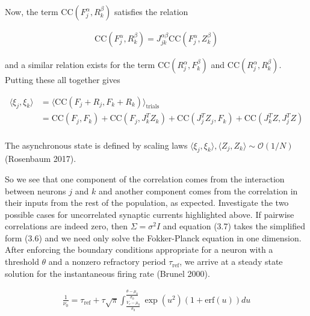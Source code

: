 \documentclass{ucetd}
\begin{document}
Now, the term $\mathrm{CC}(F_{j}^{\alpha},R_{k}^{\beta})$ satisfies the relation

\begin{align*}
\mathrm{CC}(F_{j}^{\alpha},R_{k}^{\beta}) = J^{\alpha\beta}_{jk}\mathrm{CC}(F_{j}^{\alpha},Z_{k}^{\beta})
\end{align*}

and a similar relation exists for the term $\mathrm{CC}(R_{j}^{\alpha},F_{k}^{\beta})$ and $\mathrm{CC}(R_{j}^{\alpha},R_{k}^{\beta})$. Putting these all together gives

\begin{align*}
\langle \xi_{j}, \xi_{k}\rangle &= \langle\mathrm{CC}(F_{j} + R_{j},F_{k} + R_{k})\rangle_{\mathrm{trials}}\\
&= \mathrm{CC}(F_{j},F_{k}) + \mathrm{CC}(F_{j},J_{k}^{T}Z_{k}) + \mathrm{CC}(J_{j}^{T} Z_{j}, F_{k}) + \mathrm{CC}(J_{k}^{T}Z, J_{j}^{T}Z) \\
\end{align*}

The asynchronous state is defined by scaling laws $\langle \xi_{j}, \xi_{k}\rangle, \langle Z_{j}, Z_{k}\rangle \sim \mathcal{O}(1/N)$ (Rosenbaum 2017).


So we see that one component of the correlation comes from the interaction between neurons $j$ and $k$ and another component comes from the correlation in their inputs from the rest of the population, as expected. Investigate the two possible cases for uncorrelated synaptic currents highlighted above. If pairwise correlations are indeed zero, then $\Sigma = \sigma^{2}I$ and equation (3.7) takes the simplified form (3.6) and we need only solve the Fokker-Planck equation in one dimension. After enforcing the boundary conditions appropriate for a neuron with a threshold $\theta$ and a nonzero refractory period $\tau_{\mathrm{ref}}$, we arrive at a steady state solution for the instantaneous firing rate (Brunel 2000). 

\begin{align}
\frac{1}{\nu_{0}} = \tau_{\mathrm{ref}} + \tau\sqrt{\pi}\int_{\frac{V_{r}-\mu_{0}}{\sigma_{0}}}^{\frac{\theta-\mu_{0}}{\sigma_{0}}} \exp(u^{2})(1+\mathrm{erf}(u))du
\end{align}
\end{document}

